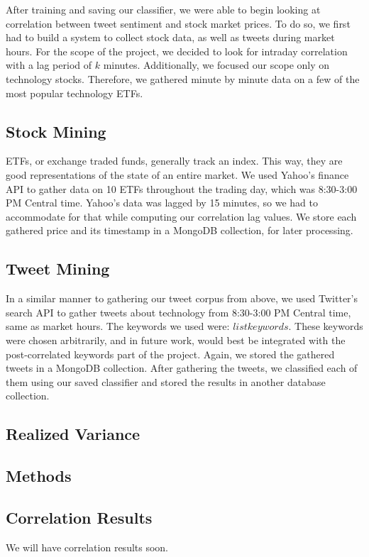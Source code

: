 \documentclass[preprint,pre,floats,aps,amsmath,amssymb,12pt]{revtex4}
\begin{document}
After training and saving our classifier, we were able to begin looking at correlation between tweet sentiment and stock market prices. To do so, we first had to build a system to collect stock data, as well as tweets during market hours. For the scope of the project, we decided to look for intraday correlation with a lag period of $k$ minutes. Additionally, we focused our scope only on technology stocks. Therefore, we gathered minute by minute data on a few of the most popular technology ETFs. 


\subsection{Stock Mining}

ETFs, or exchange traded funds, generally track an index. This way, they are good representations of the state of an entire market. We used Yahoo's finance API to gather data on 10 ETFs throughout the trading day, which was 8:30-3:00 PM Central time. Yahoo's data was lagged by 15 minutes, so we had to accommodate for that while computing our correlation lag values. We store each gathered price and its timestamp in a MongoDB collection, for later processing.

\subsection{Tweet Mining}

In a similar manner to gathering our tweet corpus from above, we used Twitter's search API to gather tweets about technology from 8:30-3:00 PM Central time, same as market hours. The keywords we used were: 
$list keywords$. 
These keywords were chosen arbitrarily, and in future work, would best be integrated with the post-correlated keywords part of the project. 
Again, we stored the gathered tweets in a MongoDB collection. After gathering the tweets, we classified each of them using our saved classifier and stored the results in another database collection. 

\subsection{Realized Variance}

\subsection{Methods}

\subsection{Correlation Results}
We will have correlation results soon.
\end{document}
